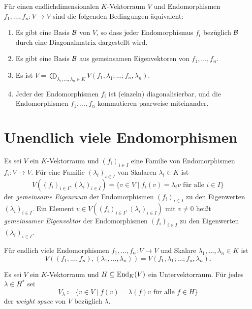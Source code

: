\documentclass[a4paper,10pt]{article}
\begin{document}
\begin{corollary}
  Für einen endlichdimensionalen $K$-Vektorraum $V$ und Endomorphismen $f_1, \dotsc, f_n \colon V \to V$ sind die folgenden Bedingungen äquivalent:
  \begin{enumerate}
    \item
      Es gibt eine Basis $\mathcal{B}$ von $V$, so dass jeder Endomorphismus $f_i$ bezüglich $\mathcal{B}$ durch eine Diagonalmatrix dargestellt wird.
    \item
      Es gibt eine Basis $\mathcal{B}$ aus gemeinsamen Eigenvektoren von $f_1, \dotsc, f_n$.
    \item
      Es ist $V = \bigoplus_{\lambda_1, \dotsc, \lambda_n \in K} V(f_1, \lambda_1; \dotsc; f_n, \lambda_n)$.
    \item
      Jeder der Endomorphismen $f_i$ ist (einzeln) diagonalisierbar, und die Endomorphismen $f_1, \dotsc, f_n$ kommutieren paarweise miteinander.
  \end{enumerate}
\end{corollary}










\section{Unendlich viele Endomorphismen}


\begin{definition}
  Es sei $V$ ein $K$-Vektorraum und $(f_i)_{i \in I}$ eine Familie von Endomorphismen $f_i \colon V \to V$.
  Für eine Familie $(\lambda_i)_{i \in I}$ von Skalaren $\lambda_i \in K$ ist
  \[
      V((f_i)_{i \in I}, (\lambda_i)_{i \in I})
    = \{ v \in V \mid \text{$f_i(v) = \lambda_i v$ für alle $i \in I$} \}
  \]
  der \emph{gemeinsame Eigenraum} der Endomorphismen $(f_i)_{i \in I}$ zu den Eigenwerten $(\lambda_i)_{i \in I}$.
  Ein Element $v \in V((f_i)_{i \in I}, (\lambda_i)_{i \in I})$ mit $v \neq 0$ heißt \emph{gemeinsamer Eigenvektor} der Endomorphismen $(f_i)_{i \in I}$ zu den Eigenwerten $(\lambda_i)_{i \in I}$.
\end{definition}


\begin{remark}
  Für endlich viele Endomorphismen $f_1, \dotsc, f_n \colon V \to V$ und Skalare $\lambda_1, \dotsc, \lambda_n \in K$ ist
  \[
      V((f_1, \dotsc, f_n), (\lambda_1, \dotsc, \lambda_n))
    = V(f_1, \lambda_1; \dotsc; f_n, \lambda_n).
  \]
\end{remark}




\begin{definition}
  Es sei $V$ ein $K$-Vektorraum und $H \subseteq \mathrm{End}_K(V)$ ein Untervektorraum.
  Für jedes $\lambda \in H^*$ sei
  \[
              V_\lambda
    \coloneqq \{v \in V \mid \text{$f(v) = \lambda(f) v$ für alle $f \in H$}\}
  \]
  der \emph{weight space} von $V$ bezüglich $\lambda$.
\end{definition}
\end{document}
